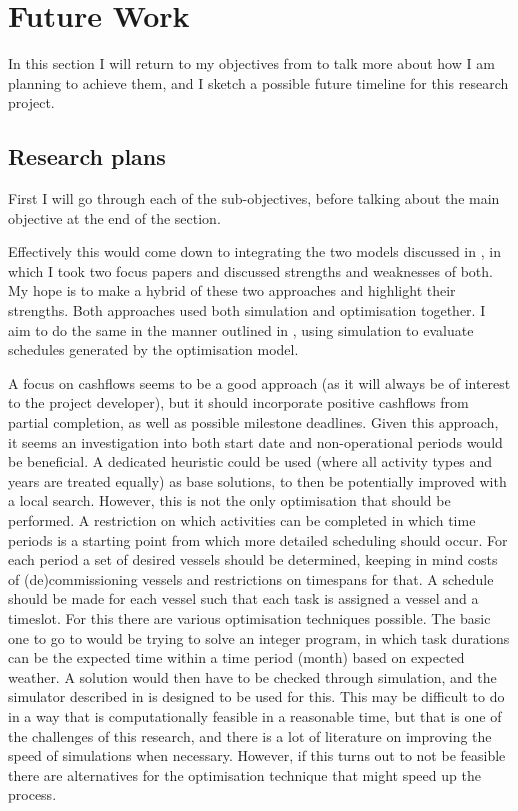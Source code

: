 \documentclass[a4paper,12pt]{article}
\begin{document}
\pagebreak

\section{Future Work} \label{s:concl}
In this section I will return to my objectives from  to talk more about how I am planning to achieve them, and I sketch a possible future timeline for this research project. 

\subsection{Research plans} \label{ss:plans}
First I will go through each of the sub-objectives, before talking about the main objective at the end of the section. 


Effectively this would come down to integrating the two models discussed in , in which I took two focus papers \cite{barlow2018mixed,kerkhove2017optimised} and discussed strengths and weaknesses of both. My hope is to make a hybrid of these two approaches and highlight their strengths. Both approaches used both simulation and optimisation together. I aim to do the same in the manner outlined in , using simulation to evaluate schedules generated by the optimisation model. 

A focus on cashflows seems to be a good approach (as it will always be of interest to the project developer), but it should incorporate positive cashflows from partial completion, as well as possible milestone deadlines. Given this approach, it seems an investigation into both start date and non-operational periods would be beneficial. A dedicated heuristic  could be used (where all activity types and years are treated equally) as base solutions, to then be potentially improved with a local search. However, this is not the only optimisation that should be performed. A restriction on which activities can be completed in which time periods is a starting point from which more detailed scheduling should occur. For each period a set of desired vessels should be determined, keeping in mind costs of (de)commissioning vessels and restrictions on timespans for that. A schedule should be made for each vessel such that each task is assigned a vessel and a timeslot. For this there are various optimisation techniques possible. The basic one to go to would be trying to solve an integer program, in which task durations can be the expected time within a time period (month) based on expected weather. A solution would then have to be checked through simulation, and the simulator described in  is designed to be used for this. This may be difficult to do in a way that is computationally feasible in a reasonable time, but that is one of the challenges of this research, and there is a lot of literature on improving the speed of simulations when necessary. However, if this turns out to not be feasible there are alternatives for the optimisation technique that might speed up the process. 
\end{document}
